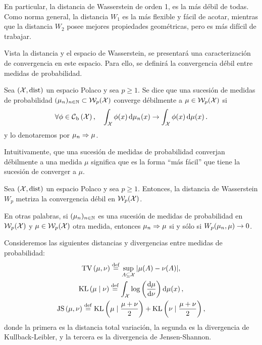 {{\begin{remark}
		  En particular, la distancia de Wasserstein de orden 1, es la más débil de todas. Como norma general, la distancia $W_1$  es la más flexible y fácil de acotar, mientras que la distancia $W_2$ posee mejores propiedades geométricas, pero es más difícil de trabajar.
	  \end{remark}

	  Vista la distancia y el espacio de Wasserstein, se presentará una caracterización de convergencia en este espacio. Para ello, se definirá la convergencia débil entre medidas de probabilidad.

	  \begin{definition}
		  Sea $(\cX, \dist)$ un espacio Polaco y sea $p \geq 1$. Se dice que una sucesión de medidas de probabilidad $(\mu_n)_{n \in \N} \subset \WassersteinSpace[p]{\cX} $ converge débilmente a $\mu \in \WassersteinSpace[p]{\cX}$ si
		  \begin{equation}
			  \forall \phi \in \ContBoundedSpace[\cX], \quad \int_{\cX} \phi(x) \dd{\mu_n(x)} \to \int_{\cX} \phi(x) \dmu[x].
		  \end{equation}
		  y lo denotaremos por $\mu_n \wto \mu$.
	  \end{definition}

	  \begin{note}
		  Intuitivamente, que una sucesión de medidas de probabilidad converjan débilmente a una medida $\mu$ significa que es la forma ``más fácil'' que tiene la sucesión de converger a $\mu$.
	  \end{note}

	  \begin{theorem}
		  Sea $(\cX, \dist)$ un espacio Polaco y sea $p \geq 1$. Entonces, la distancia de Wasserstein $W_p$  metriza la convergencia débil en $\WassersteinSpace[p]{\cX}$.
	  \end{theorem}

	  \begin{remark}
		  En otras palabras, si $(\mu_n)_{n\in\N}$ es una sucesión de medidas de probabilidad en $\WassersteinSpace[p]{\cX}$ y $\mu\in \WassersteinSpace[p]{\cX} $ otra medida, entonces $\mu_n \wto \mu$ si y sólo si $\Wasserstein[p]{\mu_n}{\mu} \to 0$.
	  \end{remark}

	  \begin{example}
		  Consideremos las siguientes distancias y divergencias entre medidas de probabilidad:
		  \begin{gather*}
			  \TV{\mu}{\nu} \eqdef \sup_{A \subseteq \cX} \abs{\mu(A) - \nu(A)}, \\
			  \KL{\mu}{\nu} \eqdef \int_{\cX} \log\left(\dv{\mu}{\nu}(x)\right) \dmu[x], \\
			  \JS{\mu}{\nu} \eqdef \KL{\mu}{\frac{\mu + \nu}{2}} + \KL{\nu}{\frac{\mu + \nu}{2}},
		  \end{gather*}
		  donde la primera es la distancia total variación, la segunda es la divergencia de Kullback-Leibler, y la tercera es la divergencia de Jensen-Shannon.


\end{example}}}
